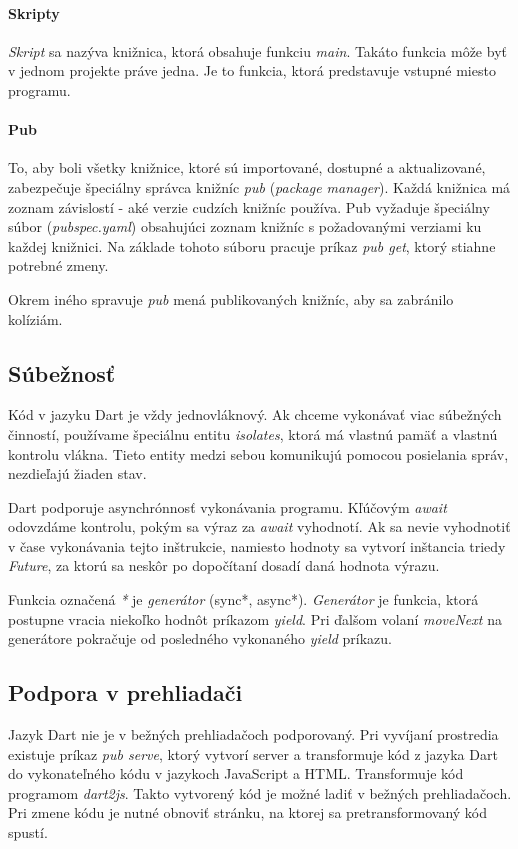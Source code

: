 \paragraph{Skripty}
\emph{Skript} sa nazýva knižnica, ktorá obsahuje funkciu \emph{main}. Takáto funkcia môže byť v jednom projekte práve jedna. Je to funkcia, ktorá predstavuje vstupné miesto programu.

\paragraph{Pub}
To, aby boli všetky knižnice, ktoré sú importované, dostupné a aktualizované, zabezpečuje špeciálny správca knižníc \emph{pub} (\emph{package manager}). 
Každá knižnica má zoznam závislostí - aké verzie cudzích knižníc používa. 
Pub vyžaduje špeciálny súbor (\emph{pubspec.yaml}) obsahujúci zoznam knižníc s požadovanými verziami ku každej knižnici. Na základe tohoto súboru pracuje príkaz \emph{pub get}, ktorý stiahne potrebné zmeny.

Okrem iného spravuje \emph{pub} mená publikovaných knižníc, aby sa zabránilo kolíziám.

\subsection{Súbežnosť}%
Kód v jazyku Dart je vždy jednovláknový. Ak chceme vykonávať viac súbežných činností, používame špeciálnu entitu \emph{isolates}, ktorá má vlastnú pamäť a vlastnú kontrolu vlákna. Tieto entity medzi sebou komunikujú pomocou posielania správ, nezdieľajú žiaden stav.

Dart podporuje asynchrónnosť vykonávania programu. Kľúčovým \emph{await} odovzdáme kontrolu, pokým sa výraz za \emph{await} vyhodnotí. Ak sa nevie vyhodnotiť v čase vykonávania tejto inštrukcie, namiesto hodnoty sa vytvorí inštancia triedy \emph{Future}, za ktorú sa neskôr po dopočítaní dosadí daná hodnota výrazu.%

Funkcia označená \emph{*} je \emph{generátor} (sync*, async*). \emph{Generátor} je funkcia, ktorá postupne vracia niekoľko hodnôt príkazom \emph{yield}. Pri ďalšom volaní \emph{moveNext} na generátore pokračuje od posledného vykonaného \emph{yield} príkazu.

\subsection{Podpora v prehliadači}
Jazyk Dart nie je v bežných prehliadačoch podporovaný. Pri vyvíjaní prostredia existuje príkaz \emph{pub serve}, ktorý vytvorí server a transformuje kód z jazyka Dart do vykonateľného kódu v jazykoch JavaScript a HTML. Transformuje kód programom \emph{dart2js}. Takto vytvorený kód je možné ladiť v bežných prehliadačoch. Pri zmene kódu je nutné obnoviť stránku, na ktorej sa pretransformovaný kód spustí.

